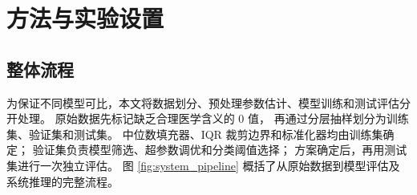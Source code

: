 \section{方法与实验设置}

\subsection{整体流程}

为保证不同模型可比，本文将数据划分、预处理参数估计、模型训练和测试评估分开处理。
原始数据先标记缺乏合理医学含义的 0 值，
再通过分层抽样划分为训练集、验证集和测试集。
中位数填充器、IQR 裁剪边界和标准化器均由训练集确定；
验证集负责模型筛选、超参数调优和分类阈值选择；
方案确定后，再用测试集进行一次独立评估。
图 \ref{fig:system_pipeline} 概括了从原始数据到模型评估及系统推理的完整流程。

